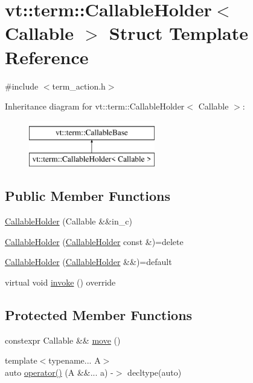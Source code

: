 \hypertarget{structvt_1_1term_1_1_callable_holder}{}\section{vt\+:\+:term\+:\+:Callable\+Holder$<$ Callable $>$ Struct Template Reference}
\label{structvt_1_1term_1_1_callable_holder}


{\ttfamily \#include $<$term\+\_\+action.\+h$>$}

Inheritance diagram for vt\+:\+:term\+:\+:Callable\+Holder$<$ Callable $>$\+:\begin{figure}[H]
\begin{center}
\leavevmode
\includegraphics[height=2.000000cm]{structvt_1_1term_1_1_callable_holder}
\end{center}
\end{figure}
\subsection*{Public Member Functions}
\begin{DoxyCompactItemize}
\item 
\hyperlink{structvt_1_1term_1_1_callable_holder_a69d93533fc725eb0206a34e98395b7f3}{Callable\+Holder} (Callable \&\&in\+\_\+c)
\item 
\hyperlink{structvt_1_1term_1_1_callable_holder_a61c0e9929ff96936132fe697d6585992}{Callable\+Holder} (\hyperlink{structvt_1_1term_1_1_callable_holder}{Callable\+Holder} const \&)=delete
\item 
\hyperlink{structvt_1_1term_1_1_callable_holder_a02091f8787e03f8e29a9e78a975b86d4}{Callable\+Holder} (\hyperlink{structvt_1_1term_1_1_callable_holder}{Callable\+Holder} \&\&)=default
\item 
virtual void \hyperlink{structvt_1_1term_1_1_callable_holder_a33bc8b5d543eb4338c257522cc0084f1}{invoke} () override
\end{DoxyCompactItemize}
\subsection*{Protected Member Functions}
\begin{DoxyCompactItemize}
\item 
constexpr Callable \&\& \hyperlink{structvt_1_1term_1_1_callable_holder_a9a1517406276e39c5a5c140196ea7ccf}{move} ()
\item 
{\footnotesize template$<$typename... A$>$ }\\auto \hyperlink{structvt_1_1term_1_1_callable_holder_a4cf06b82cc1a80a9070f77de9841957f}{operator()} (A \&\&... a) -\/$>$ decltype(auto)
\end{DoxyCompactItemize}

